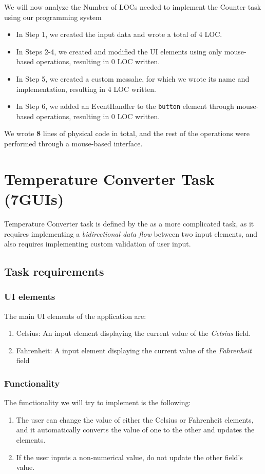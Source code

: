 We will now analyze the Number of LOCs needed to implement the Counter task using our programming system
\begin{itemize}
	\item In Step 1, we created the input data and wrote a total of 4 LOC.
	\item   In Steps 2-4, we created and modified the UI elements using only mouse-based operations, resulting in 0 LOC written.
	\item   In Step 5, we created a custom messahe, for which we wrote its name and implementation, resulting in 4 LOC written.
	\item   In Step 6, we added an EventHandler to the \texttt{button} element through mouse-based operations, resulting in 0 LOC written.
\end{itemize}
\noindent We wrote \textbf{8} lines of physical code in total, and the rest of the operations were performed through a mouse-based interface.







\clearpage
\section{Temperature Converter Task (7GUIs)}
Temperature Converter task is defined by the \citet{7GUIs-web} as a more complicated task, as it requires implementing a \emph{bidirectional data flow} between
two input elements, and also requires implementing custom validation of user input.

\medskip
\subsection{Task requirements}
\subsubsection{UI elements}
The main UI elements of the application are:
\begin{enumerate}
	\item Celsius: An input element displaying the current value of the \emph{Celsius} field.
	\item Fahrenheit: A input element displaying the current value of the \emph{Fahrenheit} field
\end{enumerate}

\subsubsection{Functionality}
The functionality we will try to implement is the following:
\begin{enumerate}
	\item The user can change the value of either the Celsius or Fahrenheit elements, and it automatically converts the value of one to the other and updates the elements.
	\item If the user inputs a non-numerical value, do not update the other field's value.
\end{enumerate}
\medskip
